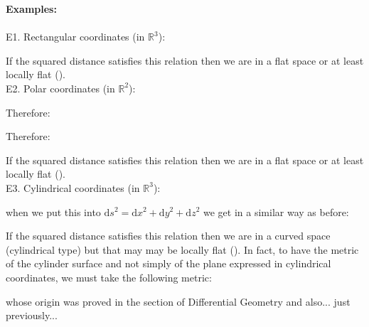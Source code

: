 	\begin{tcolorbox}[colframe=black,colback=white,sharp corners]
	\textbf{{\Large {}}Examples:}\\\\	
	E1. Rectangular coordinates (in $\mathbb{R}^3$):
	
	If the squared distance satisfies this relation then we are in a flat space or at least locally flat ().\\
	
	E2. Polar coordinates (in $\mathbb{R}^2$):
	
	Therefore:
	
	Therefore:
	
	If the squared distance satisfies this relation then we are in a flat space or at least locally flat ().\\
	
	E3. Cylindrical coordinates (in $\mathbb{R}^3$):
	
	when we put this into $\mathrm{d}s^2=\mathrm{d}x^2+\mathrm{d}y^2+\mathrm{d}z^2$ we get in a similar way as before:
	
	If the squared distance satisfies this relation then we are in a curved space (cylindrical type) but that may may be locally flat (). In fact, to have the metric of the cylinder surface and not simply of the plane expressed in cylindrical coordinates, we must take the following metric:
	
	whose origin was proved in the section of Differential Geometry and also... just previously...
	\end{tcolorbox}
	
